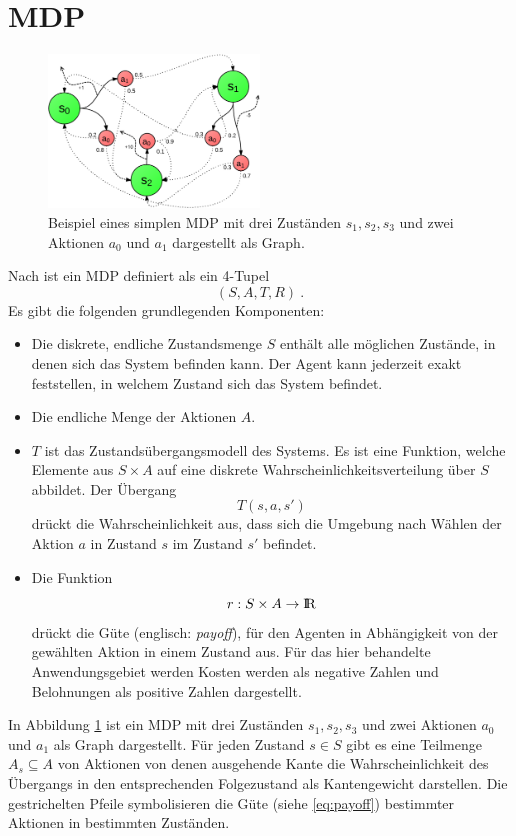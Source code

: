 \documentclass[a4paper]{IEEEtran}
\def\IR{\mathrm{I\hspace{-2pt}R}} %
\begin{document}
\section{MDP}
\begin{figure}[ht]
	\centering
	\includegraphics[width=0.5\textwidth]{images/MDP_example.png}
	\caption{Beispiel eines simplen MDP mit drei Zuständen $s_1, s_2, s_3$ und zwei Aktionen $a_0$ und $a_1$ dargestellt als Graph.}
	\label{fig:MDP_example} %
\end{figure}
Nach \cite{cassandra1995acting} ist ein MDP definiert als ein 4-Tupel
\begin{equation}
	(S, A, T, R) \ .
\end{equation}
Es gibt die folgenden grundlegenden Komponenten:
\begin{itemize}
	\item Die diskrete, endliche Zustandsmenge $S$ enthält alle möglichen Zustände, in denen sich das System befinden kann. Der Agent kann jederzeit exakt feststellen, in welchem Zustand sich das System befindet.
	\item Die endliche Menge der Aktionen $A$.
	\item $T$ ist das Zustandsübergangsmodell des Systems. Es ist eine Funktion, welche Elemente aus $S \times A$ auf eine diskrete Wahrscheinlichkeitsverteilung über $S$ abbildet. Der Übergang
	\begin{equation}
		T(s, a, s')
	\end{equation}
	drückt die Wahrscheinlichkeit aus, dass sich die Umgebung nach Wählen der Aktion $a$ in Zustand $s$ im Zustand $s'$ befindet.
	\item Die Funktion
	\begin{equation}
		r: S \times A \rightarrow \IR
		\label{eq:payoff}
	\end{equation}
	drückt die Güte (englisch: \emph{payoff}), für den Agenten in Abhängigkeit von der gewählten Aktion in einem Zustand aus. Für das hier behandelte Anwendungsgebiet werden Kosten werden als negative Zahlen und Belohnungen als positive Zahlen dargestellt.
\end{itemize}
In Abbildung \ref{fig:MDP_example} ist ein MDP mit drei Zuständen $s_1, s_2, s_3$ und zwei Aktionen $a_0$ und $a_1$ als Graph dargestellt. Für jeden Zustand $s \in S$ gibt es eine Teilmenge $A_s \subseteq A$ von Aktionen von denen ausgehende Kante die Wahrscheinlichkeit des Übergangs in den entsprechenden Folgezustand als Kantengewicht darstellen. Die gestrichelten Pfeile symbolisieren die Güte (siehe \ref{eq:payoff}) bestimmter Aktionen in bestimmten Zuständen.
\end{document}
